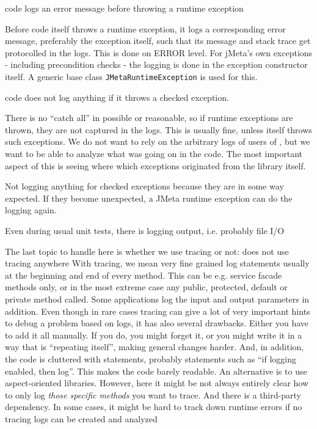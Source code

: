 {%
\LibName{} code logs an error message before throwing a runtime exception
}
{%
Before \LibName{} code itself throws a runtime exception, it logs a corresponding error message, preferably the exception itself, such that its message and stack trace get protocolled in the logs. This is done on ERROR level. For jMeta's own exceptions - including precondition checks - the logging is done in the exception constructor itself. A generic base class \texttt{JMetaRuntimeException} is used for this.

\LibName{} code does not log anything if it throws a checked exception.
}
{%
There is no ``catch all'' in \LibName{} possible or reasonable, so if runtime exceptions are thrown, they are not captured in the \LibName{} logs. This is usually fine, unless \LibName{} itself throws such exceptions. We do not want to rely on the arbitrary logs of users of \LibName{}, but we want to be able to analyze what was going on in the \LibName{} code. The most important aspect of this is seeing where which exceptions originated from the library itself.

Not logging anything for checked exceptions because they are in some way expected. If they become unexpected, a JMeta runtime exception can do the logging again.
}
{%
Even during usual unit tests, there is logging output, i.e. probably file I/O
}

The last topic to handle here is whether we use tracing or not:
{%
\LibName{} does not use tracing anywhere
}
{%
With tracing, we mean very fine grained log statements usually at the beginning and end of every method. This can be e.g. service facade methods only, or in the most extreme case any public, protected, default or private method called. Some applications log the input and output parameters in addition.
}
{%
Even though in rare cases tracing can give a lot of very important hints to debug a problem based on logs, it has also several drawbacks. Either you have to add it all manually. If you do, you might forget it, or you might write it in a way that is ``repeating itself'', making general changes harder. And, in addition, the code is cluttered with statements, probably statements such as ``if logging enabled, then log''. This makes the code barely readable. An alternative is to use aspect-oriented libraries. However, here it might be not always entirely clear how to only log \emph{those specific methods} you want to trace. And there is a third-party dependency.
}
{%
In some cases, it might be hard to track down runtime errors if no tracing logs can be created and analyzed
}


